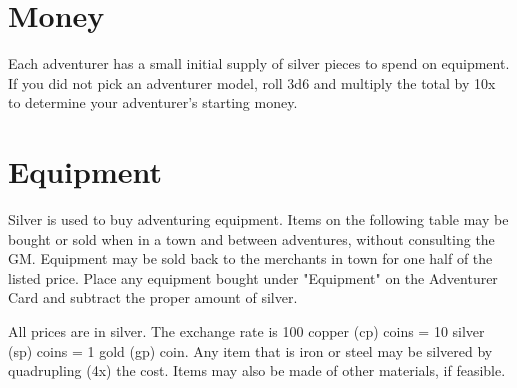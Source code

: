 \section{Money}

Each adventurer has a small initial supply of silver pieces to spend on equipment. If you did not pick an adventurer model, roll 3d6 and multiply the total by 10x to determine your adventurer's starting money.
\section{Equipment}

Silver is used to buy adventuring equipment. Items on the following table may be bought or sold when in a town and between adventures, without consulting the GM. Equipment may be sold back to the merchants in town for one half of the listed price. Place any equipment bought under "Equipment" on the Adventurer Card and subtract the proper amount of silver.

All prices are in silver. The exchange rate is 100 copper (cp)  coins = 10 silver (sp) coins = 1  gold (gp) coin. Any item that is iron or steel may be silvered by quadrupling (4x) the cost. Items may also be made of other materials, if feasible.

